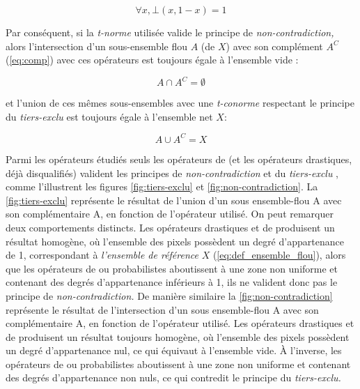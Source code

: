 \begin{equation}
  \forall x, ⊥(x,1-x) = 1
\end{equation}

Par conséquent, si la \emph{t-norme} utilisée valide le principe de
\emph{non-contradiction,} alors l'intersection d'un sous-ensemble flou
\(A\) (de \(X\)) avec son complément \(A^C\) (\autoref{eq:comp}) avec
ces opérateurs est toujours égale à l'ensemble vide :

\begin{equation}
  A \cap A^C = \emptyset
\end{equation}

et l'union de ces mêmes sous-ensembles avec une \emph{t-conorme}
respectant le principe du \emph{tiers-exclu} est toujours égale à
l'ensemble net \(X\):

\begin{equation}
  A \cup A^C = X
\end{equation}

Parmi les opérateurs étudiés seuls les opérateurs de 
(et les opérateurs drastiques, déjà disqualifiés) valident les
principes de \emph{non-contradiction} et du \emph{tiers-exclu}
\autocite{Bouchon-Meunier2007}, comme l'illustrent les figures
\ref{fig:tiers-exclu} et \ref{fig:non-contradiction}. La
\autoref{fig:tiers-exclu} représente le résultat de l'union d'un sous
ensemble-flou \textcolor{RdBu-9-1}{\textsf{A}} avec son complémentaire
\textcolor{RdBu-9-9}{\textsf{A}}, en fonction de l'opérateur
utilisé. On peut remarquer deux comportements distincts. Les
opérateurs drastiques et de  produisent un résultat
homogène, où l'ensemble des pixels possèdent un degré d'appartenance
de 1, correspondant à \emph{l'ensemble de référence} \(X\)
(\autoref{eq:def_ensemble_flou}), alors que les opérateurs de
 ou probabilistes aboutissent à une zone non uniforme et
contenant des degrés d'appartenance inférieurs à 1, ils ne valident
donc pas le principe de \emph{non-contradiction.} De manière similaire
la \autoref{fig:non-contradiction} représente le résultat de
l'intersection d'un sous ensemble-flou
\textcolor{RdBu-9-1}{\textsf{A}} avec son complémentaire
\textcolor{RdBu-9-9}{\textsf{A}}, en fonction de l'opérateur
utilisé. Les opérateurs drastiques et de  produisent
un résultat toujours homogène, où l'ensemble des pixels possèdent un
degré d'appartenance nul, ce qui équivaut à l'ensemble vide. À
l'inverse, les opérateurs de  ou probabilistes aboutissent
à une zone non uniforme et contenant des degrés d'appartenance non
nuls, ce qui contredit le principe du \emph{tiers-exclu.}

